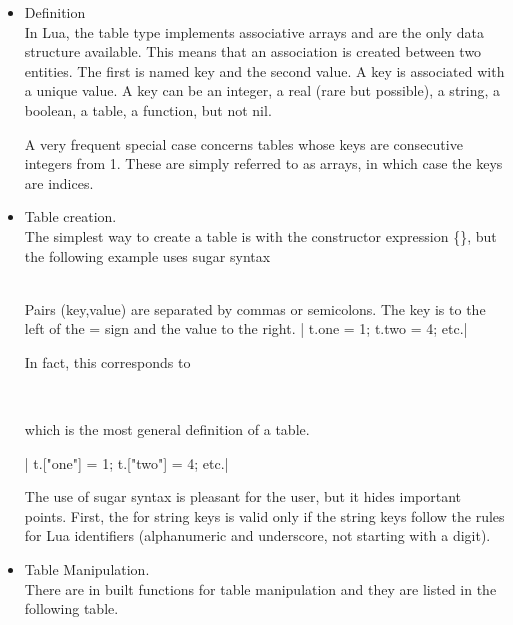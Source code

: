 \begin{itemize}

\item Definition\\
In Lua, the table type implements associative arrays and are the only data structure available. This means that an association is created between two entities. The first is named key and the second value. A key is associated with a unique value. A key can be an integer, a real (rare but possible), a string, a boolean, a table, a function, but not nil.

  A very frequent special case concerns tables whose keys are consecutive integers from 1. These are simply referred to as arrays, in which case the keys are indices.


  \item Table creation.\\
  The simplest way to create a table is with the constructor expression \{\}, but the following example uses sugar syntax

  \begin{mybox}
     \\
    Pairs (key,value) are separated by commas or semicolons. The key is to the left of the = sign and the value to the right.
   | t.one = 1; t.two = 4; etc.|
  \end{mybox}

  In fact, this corresponds to

  \begin{mybox}
     \\
  \end{mybox}

  which is the most general definition of a table.

   | t.["one"] = 1; t.["two"] = 4; etc.|

  The use of sugar syntax is pleasant for the user, but it hides important points. First, the  for string keys is valid only if the string keys  follow the rules for Lua identifiers (alphanumeric and underscore, not starting with a digit).

  \item Table Manipulation.\\
There are in built functions for table manipulation and they are listed in the following table.


\end{itemize}
